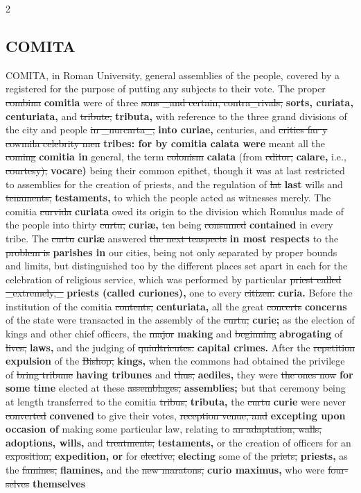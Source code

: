 \documentclass[10pt]{article}
\begin{document}
\begin{multicols}{2}
\subsection*{COMITA}
COMITA, in Roman University, general assemblies of the people, covered by a registered for the purpose of putting any subjects to their vote. The proper \sout{combina} \textbf{comitia} were of three \sout{sons \_and certain, contra\_rivals,} \textbf{sorts, curiata, centuriata,} and \sout{tribute,} \textbf{tributa,} with reference to the three grand divisions of the city and people \sout{in \_nurcarta\_,} \textbf{into curiae,} centuries, and \sout{critics far y cowmila celebrity men} \textbf{tribes: for by comitia calata were} meant all the \sout{coming} \textbf{comitia in} general, the term \sout{colonism} \textbf{calata} (from \sout{editor,} \textbf{calare,} i.e., \sout{courtesy),} \textbf{vocare)} being their common epithet, though it was at last restricted to assemblies for the creation of priests, and the regulation of \sout{lat} \textbf{last} wills and \sout{tenaments,} \textbf{testaments,} to which the people acted as witnesses merely. The comitia \sout{curvida} \textbf{curiata} owed its origin to the division which Romulus made of the people into thirty \sout{curtu,} \textbf{curiæ,} ten being \sout{consumed} \textbf{contained} in every tribe. The \sout{curtu} \textbf{curiæ} answered \sout{the next teaspects} \textbf{in most respects} to the \sout{problem is} \textbf{parishes in} our cities, being not only separated by proper bounds and limits, but distinguished too by the different places set apart in each for the celebration of religious service, which was performed by particular \sout{priest called \_extremely,\_} \textbf{priests (called curiones),} one to every \sout{citizen.} \textbf{curia.} Before the institution of the comitia \sout{contents,} \textbf{centuriata,} all the great \sout{concerts} \textbf{concerns} of the state were transacted in the assembly of the \sout{curtu;} \textbf{curie;} as the election of kings and other chief officers, the \sout{major} \textbf{making} and \sout{beginning} \textbf{abrogating} of \sout{lives,} \textbf{laws,} and the judging of \sout{quiultricutes.} \textbf{capital crimes.} After the \sout{repetition} \textbf{expulsion} of the \sout{Bishop,} \textbf{kings,} when the commons had obtained the privilege of \sout{bring tribune} \textbf{having tribunes} and \sout{thus,} \textbf{aediles,} they were \sout{the ones now} \textbf{for some time} elected at these \sout{assemblages,} \textbf{assemblies;} but that ceremony being at length transferred to the comitia \sout{tribus,} \textbf{tributa,} the \sout{curtu} \textbf{curie} were never \sout{converted} \textbf{convened} to give their votes, \sout{reception venue, and} \textbf{excepting upon occasion of} making some particular law, relating to \sout{an adaptation, walls,} \textbf{adoptions, wills,} and \sout{treatments,} \textbf{testaments,} or the creation of officers for an \sout{exposition,} \textbf{expedition, or} for \sout{elective,} \textbf{electing} some of the \sout{priets,} \textbf{priests,} as the \sout{famines,} \textbf{flamines,} and the \sout{new maratons,} \textbf{curio maximus,} who were \sout{four-selves} \textbf{themselves} 
\end{multicols}
\end{document}
